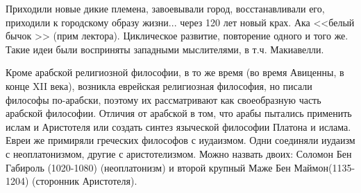 Приходили новые дикие племена, завоевывали город, восстанавливали его, приходили к городскому образу жизни... через 120 лет новый крах. Ака <<белый бычок >> (прим лектора). Циклическое развитие, повторение одного и того же. Такие идеи были восприняты западными мыслителями, в т.ч. Макиавелли.

Кроме арабской религиозной философии, в то же время (во время Авиценны, в конце XII века), возникла еврейская религиозная философия, но писали философы по-арабски, поэтому их рассматривают как своеобразную часть арабской философии. Отличия от арабской в том, что арабы пытались применить ислам и Аристотеля или создать синтез языческой философии Платона и ислама. Евреи же примиряли греческих философов с иудаизмом. Одни соединяли иудаизм с неоплатонизмом, другие с аристотелизмом. Можно назвать двоих: Соломон Бен Габироль (1020-1080) (неоплатонизм) и второй крупный Маже Бен Маймон(1135-1204) (сторонник Аристотеля).